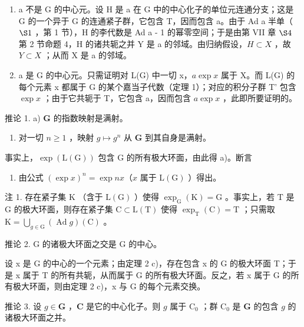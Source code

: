 \begin{enumerate}
\def\labelenumi{\arabic{enumi})}
\item
  a 不是 G 的中心元。设 H 是 a 在 G 中的中心化子的单位元连通分支；这是 G 的一个异于 G 的连通紧子群，它包含 T，因而包含 a。由于 Ad a 半单（ \(\S1\) ，第 1 节），H 的李代数是 Ad a - 1 的幂零空间；于是由第 VII 章 \(\S4\) 第 2 节命题 4，H 的诸共轭之并 Y 是 a 的邻域。由归纳假设，\(H \subset X\) ，故 \(Y \subset X\) ；从而 X 是 a 的邻域。
\item
  a 是 G 的中心元。只需证明对 L(G) 中一切 x，\(a \exp x\) 属于 X。而 L(G) 的每个元素 x 都属于 G 的某个嘉当子代数（定理 1）；对应的积分子群 T' 包含 \(\exp x\) ；由于它共轭于 T，它包含 a，因而包含 \(a \exp x\) ，此即所要证明的。
\end{enumerate}

推论 1. a) \(\mathbf{G}\) 的指数映射是满射。

\begin{enumerate}
\def\labelenumi{\alph{enumi})}
\setcounter{enumi}{1}
\tightlist
\item
  对一切 \(n \geq 1\) ，映射 \(g \mapsto g^n\) 从 \(\mathbf{G}\) 到其自身是满射。
\end{enumerate}

事实上，\(\exp(\mathrm{L}(\mathrm{G}))\) 包含 G 的所有极大环面，由此得 a)。断言

\begin{enumerate}
\def\labelenumi{\alph{enumi})}
\setcounter{enumi}{1}
\tightlist
\item
  由公式 \((\exp x)^n = \exp nx\)（\(x\) 属于 \(\mathrm{L}(\mathrm{G})\) ）得出。
\end{enumerate}

注 1. 存在紧子集 \(\mathrm{K}\) （含于 \(\mathrm{L}(\mathrm{G})\) ）使得 \(\exp_{\mathrm{G}}(\mathrm{K}) = \mathrm{G}\) 。事实上，若 \(\mathrm{T}\) 是 \(\mathrm{G}\) 的极大环面，则存在紧子集 \(\mathrm{C} \subset \mathrm{L}(\mathrm{T})\) 使得 \(\exp_{\mathrm{T}}(\mathrm{C}) = \mathrm{T}\) ；只需取 \(\mathrm{K} = \bigcup_{g \in \mathrm{G}} (\operatorname{Ad} g)(\mathrm{C})\) 。

推论 2. G 的诸极大环面之交是 G 的中心。

设 x 是 G 的中心的一个元素；由定理 2 c)，存在包含 x 的 G 的极大环面 T；于是 x 属于 T 的所有共轭，从而属于 G 的所有极大环面。反之，若 x 属于 G 的所有极大环面，则由定理 2 c)，x 与 G 的每个元素交换。

推论 3. 设 \(g \in \mathbf{G}\) ，\(\mathbf{C}\) 是它的中心化子。则 \(g\) 属于 \(\mathrm{C}_0\) ；群 \(\mathrm{C}_0\) 是 \(\mathbf{G}\) 的包含 \(g\) 的诸极大环面之并。

